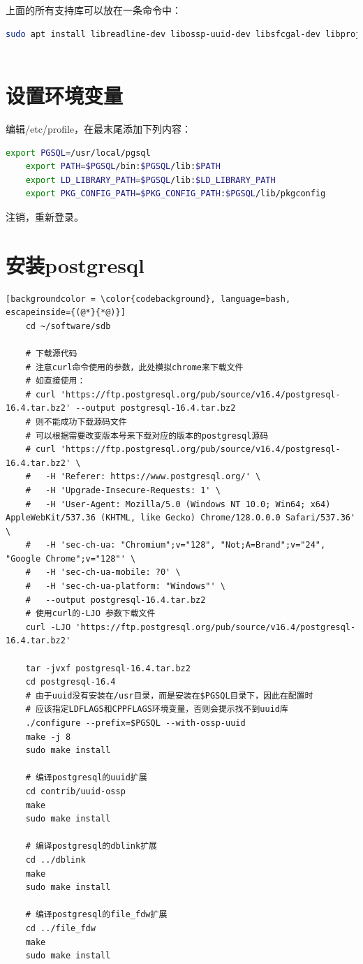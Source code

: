 上面的所有支持库可以放在一条命令中：
\begin{lstlisting}[backgroundcolor = \color{codebackground}, language=bash]
	sudo apt install libreadline-dev libossp-uuid-dev libsfcgal-dev libproj-dev libgeotiff-dev libcairo-dev libcurl-dev libicu-dev libxml2-dev protobuf-c-compiler libprotobuf-c-dev
	
\end{lstlisting}

\section{设置环境变量}
编辑/etc/profile，在最末尾添加下列内容：
\begin{lstlisting}[backgroundcolor = \color{codebackground}, language=bash]
	export PGSQL=/usr/local/pgsql
	export PATH=$PGSQL/bin:$PGSQL/lib:$PATH
	export LD_LIBRARY_PATH=$PGSQL/lib:$LD_LIBRARY_PATH
	export PKG_CONFIG_PATH=$PKG_CONFIG_PATH:$PGSQL/lib/pkgconfig
\end{lstlisting}
注销，重新登录。

\section{安装postgresql}
\begin{lstlisting}[backgroundcolor = \color{codebackground}, language=bash, escapeinside={(@*}{*@)}]
	cd ~/software/sdb
	
	# 下载源代码
	# 注意curl命令使用的参数，此处模拟chrome来下载文件
	# 如直接使用：
	# curl 'https://ftp.postgresql.org/pub/source/v16.4/postgresql-16.4.tar.bz2' --output postgresql-16.4.tar.bz2
	# 则不能成功下载源码文件
	# 可以根据需要改变版本号来下载对应的版本的postgresql源码
	# curl 'https://ftp.postgresql.org/pub/source/v16.4/postgresql-16.4.tar.bz2' \
	#	-H 'Referer: https://www.postgresql.org/' \
	#	-H 'Upgrade-Insecure-Requests: 1' \
	#	-H 'User-Agent: Mozilla/5.0 (Windows NT 10.0; Win64; x64) AppleWebKit/537.36 (KHTML, like Gecko) Chrome/128.0.0.0 Safari/537.36' \
	#	-H 'sec-ch-ua: "Chromium";v="128", "Not;A=Brand";v="24", "Google Chrome";v="128"' \
	#	-H 'sec-ch-ua-mobile: ?0' \
	#	-H 'sec-ch-ua-platform: "Windows"' \
	#	--output postgresql-16.4.tar.bz2
	# 使用curl的-LJO 参数下载文件
	curl -LJO 'https://ftp.postgresql.org/pub/source/v16.4/postgresql-16.4.tar.bz2'
	
	tar -jvxf postgresql-16.4.tar.bz2
	cd postgresql-16.4
	# 由于uuid没有安装在/usr目录，而是安装在$PGSQL目录下，因此在配置时
	# 应该指定LDFLAGS和CPPFLAGS环境变量，否则会提示找不到uuid库
	./configure --prefix=$PGSQL --with-ossp-uuid 
	make -j 8
	sudo make install
	
	# 编译postgresql的uuid扩展
	cd contrib/uuid-ossp
	make
	sudo make install
	
	# 编译postgresql的dblink扩展
	cd ../dblink
	make 
	sudo make install
	
	# 编译postgresql的file_fdw扩展
	cd ../file_fdw
	make
	sudo make install
\end{lstlisting}


